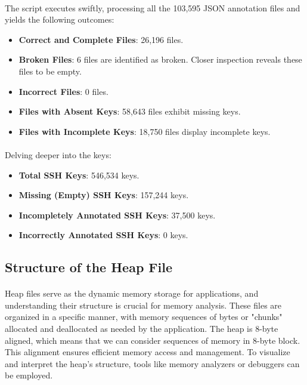             \paragraph{}The script executes swiftly, processing all the 103,595 JSON annotation files and yields the following outcomes:

            \begin{itemize}
                \item \textbf{Correct and Complete Files}: 26,196 files.
                \item \textbf{Broken Files}: 6 files are identified as broken. Closer inspection reveals these files to be empty.
                \item \textbf{Incorrect Files}: 0 files.
                \item \textbf{Files with Absent Keys}: 58,643 files exhibit missing keys.
                \item \textbf{Files with Incomplete Keys}: 18,750 files display incomplete keys.
            \end{itemize}

            \paragraph{}Delving deeper into the keys:

            \begin{itemize}
                \item \textbf{Total SSH Keys}: 546,534 keys.
                \item \textbf{Missing (Empty) SSH Keys}: 157,244 keys.
                \item \textbf{Incompletely Annotated SSH Keys}: 37,500 keys.
                \item \textbf{Incorrectly Annotated SSH Keys}: 0 keys.
            \end{itemize}

    \subsection{Structure of the Heap File}
        \paragraph{}Heap files serve as the dynamic memory storage for applications, and understanding their structure is crucial for memory analysis. These files are organized in a specific manner, with memory sequences of bytes or "chunks" allocated and deallocated as needed by the application. The heap is 8-byte aligned, which means that we can consider sequences of memory in 8-byte \gls{block}. This alignment ensures efficient memory access and management. To visualize and interpret the heap's structure, tools like memory analyzers or debuggers can be employed.

